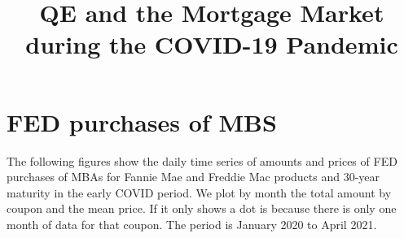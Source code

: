 \documentclass[11pt,a4paper]{article}
\begin{document}
\title{QE and the Mortgage Market during the COVID-19 Pandemic}

\maketitle



\section{FED purchases of MBS}

The following figures show the daily time series of amounts and prices of FED purchases of MBAs for Fannie Mae and Freddie Mac
 products and 30-year maturity in the early COVID period. We plot by month the total amount by coupon and the mean price. If it only shows a dot is because there is only one month of data for that coupon. The period is January 2020 to April 2021. 
\end{document}
